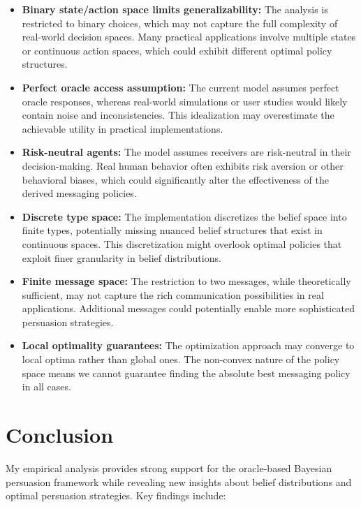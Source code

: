\documentclass[12pt]{article}
\begin{document}
\begin{itemize}
    \item \textbf{Binary state/action space limits generalizability:} The analysis is restricted to binary choices, which may not capture the full complexity of real-world decision spaces. Many practical applications involve multiple states or continuous action spaces, which could exhibit different optimal policy structures.
    
    \item \textbf{Perfect oracle access assumption:} The current model assumes perfect oracle responses, whereas real-world simulations or user studies would likely contain noise and inconsistencies. This idealization may overestimate the achievable utility in practical implementations.
    
    \item \textbf{Risk-neutral agents:} The model assumes receivers are risk-neutral in their decision-making. Real human behavior often exhibits risk aversion or other behavioral biases, which could significantly alter the effectiveness of the derived messaging policies.
    
    \item \textbf{Discrete type space:} The implementation discretizes the belief space into finite types, potentially missing nuanced belief structures that exist in continuous spaces. This discretization might overlook optimal policies that exploit finer granularity in belief distributions.
    
    \item \textbf{Finite message space:} The restriction to two messages, while theoretically sufficient, may not capture the rich communication possibilities in real applications. Additional messages could potentially enable more sophisticated persuasion strategies.
    
    \item \textbf{Local optimality guarantees:} The optimization approach may converge to local optima rather than global ones. The non-convex nature of the policy space means we cannot guarantee finding the absolute best messaging policy in all cases.
\end{itemize}

\section{Conclusion}

My empirical analysis provides strong support for the oracle-based Bayesian persuasion framework while revealing new insights about belief distributions and optimal persuasion strategies. Key findings include:
\end{document}
